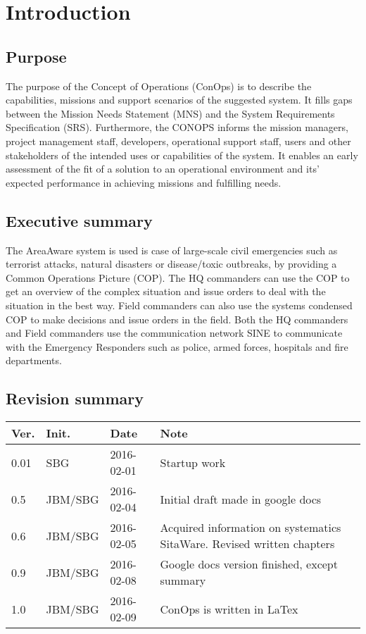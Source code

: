 \label{chp_intro}
\chapter{Introduction}

\section{Purpose}

The purpose of the Concept of Operations (ConOps) is to describe the capabilities, missions and support scenarios of the suggested system. It fills gaps between the Mission Needs Statement (MNS) and the System Requirements Specification (SRS).
Furthermore, the CONOPS informs the mission managers, project management staff, developers, operational support staff, users and other stakeholders of the intended uses or capabilities of the system. It enables an early assessment of the fit of a solution to an operational environment and its’ expected performance in achieving missions and fulfilling needs.

\section{Executive summary}

The AreaAware system is used is case of large-scale civil emergencies such as terrorist attacks, natural disasters or disease/toxic outbreaks, by providing a Common Operations Picture (COP). The HQ commanders can use the COP to get an overview of the complex situation and issue orders to deal with the situation in the best way. Field commanders can also use the systems condensed COP to make decisions and issue orders in the field. Both the HQ commanders and Field commanders use the communication network SINE to communicate with the Emergency Responders such as police, armed forces, hospitals and fire departments. 

\section{Revision summary}

\begin{tabular}{b{1cm} b{2cm} b{2cm} b{7cm}}
    \textbf{Ver.} & \textbf{Init.} & \textbf{Date} & \textbf{Note} \\
    \hline
    0.01 & SBG		& 2016-02-01 & Startup work \\
    0.5  & JBM/SBG	& 2016-02-04 & Initial draft made in google docs \\
    0.6  & JBM/SBG	& 2016-02-05 & Acquired information on systematics SitaWare. Revised written chapters \\
    0.9  & JBM/SBG	& 2016-02-08 & Google docs version finished, except summary \\
    1.0  & JBM/SBG	& 2016-02-09 & ConOps is written in LaTex \\
\end{tabular}